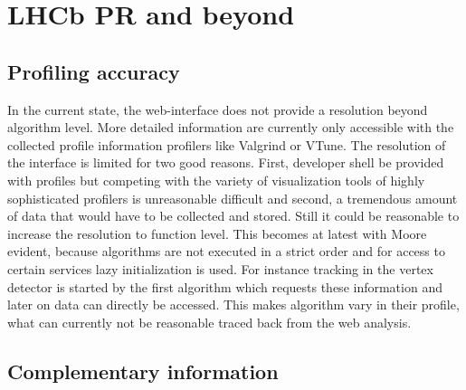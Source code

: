 \documentclass[a4paper]{jpconf}
\begin{document}
\section{LHCb PR and beyond}
\label{sec:lhcbpr_and_beyond}

\subsection{Profiling accuracy}
\label{sec:profiling accuracy}

In the current state, the web-interface does not provide a resolution beyond algorithm level. More detailed information are currently only accessible with the collected profile information profilers like Valgrind or VTune. The resolution of the interface is limited for two good reasons. First, developer shell be provided with profiles but competing with the variety of visualization tools of highly sophisticated profilers is unreasonable difficult and second, a tremendous amount of data that would have to be collected and stored. Still it could be reasonable to increase the resolution to function level. This becomes at latest with Moore evident, because algorithms are not executed in a strict order and for access to certain services lazy initialization is used. For instance tracking in the vertex detector is started by the first algorithm which requests these information and later on data can directly be accessed. This makes algorithm vary in their profile, what can currently not be reasonable traced back from the web analysis.

\subsection{Complementary information}
\label{sec:complementary_information}
\end{document}
